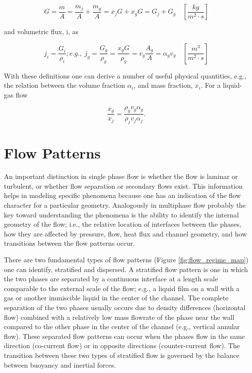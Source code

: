\begin{equation}
G = \frac{\dot{m}}{A} = \frac{\dot{m}_j}{A} + \frac{\dot{m}_g}{A} =  x_j G +  x_g G = G_j + G_g \quad [\frac{kg}{m^2\cdot s}]
\end{equation}


and volumetric flux, i, as

\begin{equation}
j_i = \frac{G_i}{\rho_i}; e.g.,\; j_g = \frac{G_g}{\rho_g} = \frac{x_g G}{\rho_g} = v_g \frac{A_g}{A} = \alpha_g v_g \quad [ \frac{m^3}{m^2 \cdot s}]
\end{equation}

With these definitions one can derive a number of useful physical quantities, e.g., the relation between the volume fraction $\alpha_i$, and mass fraction, $x_i$. 
For a liquid-gas flow

\begin{equation}
\frac{x_g}{x_j} = \frac{\rho_g v_g \alpha_g}{\rho_j v_j \alpha_j}.
\end{equation}


\section{Flow Patterns}
An important distinction in single phase flow is whether the flow is laminar or turbulent, or whether flow separation or secondary flows exist.
This information helps in modeling specific phenomena because one has an indication of the flow character for a particular geometry.
Analogously in multiphase flow probably the key toward understanding the phenomena is the ability to identify the internal geometry of the flow; i.e., the relative location of interfaces between the phases, how they are affected by pressure, flow, heat flux and channel geometry, and how transitions between the flow patterns occur.

There are two fundamental types of flow patterns (Figure \ref{fig:flow_regime_map}) one can identify, stratified and dispersed.
A stratified flow pattern is one in which the two phases are separated by a continuous interface at a length scale comparable to the external scale of the flow; e.g., a liquid film on a wall with a gas or another immiscible liquid in the center of the channel.
The complete separation of the two phases usually occurs due to density differences (horizontal flow) combined with a relatively low mass flowrate of the phase near the wall compared to the other phase in the center of the channel (e.g., vertical annular flow).
These separated flow patterns can occur when the phases flow in the same direction (co-current flow) or in opposite directions (counter-current flow).
The transition between these two types of stratified flow is governed by the balance between buoyancy and inertial forces.

